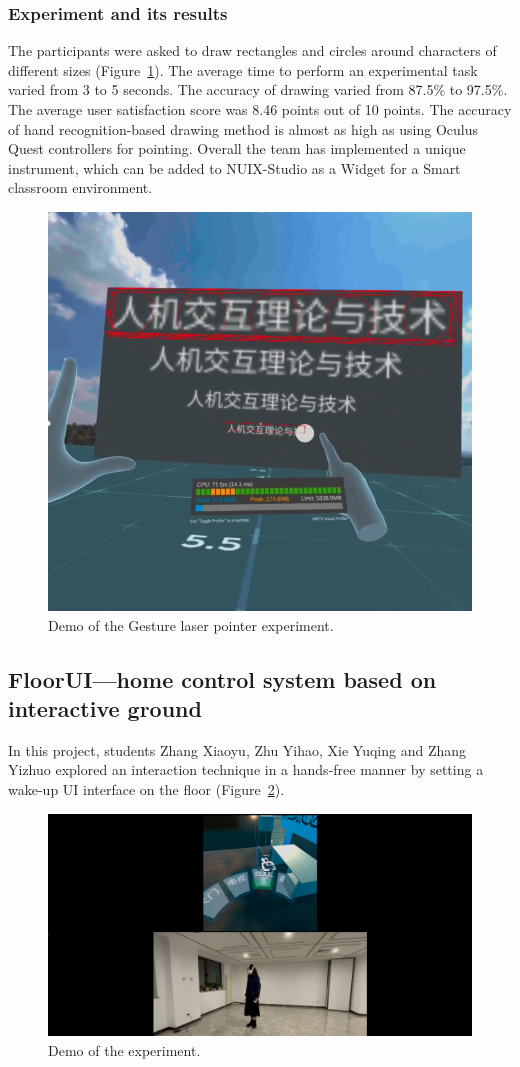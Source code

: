\subsubsection{Experiment and its results}

The participants were asked to draw rectangles and circles around characters of different sizes (Figure~\ref{fig:Project9-figure}). The average time to perform an experimental task varied from 3 to 5 seconds. The accuracy of drawing varied from 87.5\% to 97.5\%. The average user satisfaction score was 8.46 points out of 10 points. The accuracy of hand recognition-based drawing method is almost as high as using Oculus Quest controllers for pointing. Overall the team has implemented a unique instrument, which can be added to NUIX-Studio as a Widget for a Smart classroom environment.

\begin{figure}
  \centering
  \includegraphics[width=0.6\linewidth]{figures/Project_9.png}
  \caption{Demo of the Gesture laser pointer experiment.}
  \label{fig:Project9-figure}
\end{figure}

\subsection{FloorUI—home control system based on interactive ground}

In this project, students Zhang Xiaoyu, Zhu Yihao, Xie Yuqing and Zhang Yizhuo explored an interaction technique in a hands-free manner by setting a wake-up UI interface on the floor (Figure~\ref{fig:Project11-figure}). 

\begin{figure}
  \centering
  \includegraphics[width=0.9\linewidth]{figures/Project_11.png}
  \caption{Demo of the experiment.}
  \label{fig:Project11-figure}
\end{figure}

